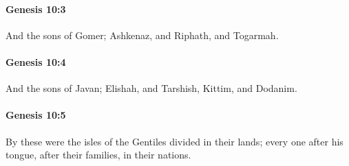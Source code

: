 		\paragraph{Genesis 10:3} %
			\label{GENESIS-10-3}

			And the sons of Gomer; Ashkenaz, and Riphath, and Togarmah.


		\paragraph{Genesis 10:4} %
			\label{GENESIS-10-4}

			And the sons of Javan; Elishah, and Tarshish, Kittim, and Dodanim.


		\paragraph{Genesis 10:5} %
			\label{GENESIS-10-5}

			By these were the isles of the Gentiles divided in their lands; every one after his tongue, after their families, in their nations.


